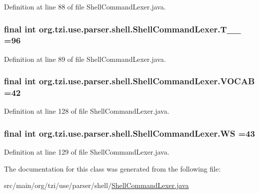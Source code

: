 Definition at line 88 of file Shell\-Command\-Lexer.\-java.

\hypertarget{classorg_1_1tzi_1_1use_1_1parser_1_1shell_1_1_shell_command_lexer_a722d65bcb74c7721bde6278b6c999754}{
\subsubsection[{T\-\_\-\-\_\-96}]{\setlength{\rightskip}{0pt plus 5cm}final int org.\-tzi.\-use.\-parser.\-shell.\-Shell\-Command\-Lexer.\-T\-\_\-\-\_ =96\hspace{0.3cm}{\ttfamily [static]}}}\label{classorg_1_1tzi_1_1use_1_1parser_1_1shell_1_1_shell_command_lexer_a722d65bcb74c7721bde6278b6c999754}


Definition at line 89 of file Shell\-Command\-Lexer.\-java.

\hypertarget{classorg_1_1tzi_1_1use_1_1parser_1_1shell_1_1_shell_command_lexer_aef9df2419ad339c0b9e0532ccc563394}{
\subsubsection[{V\-O\-C\-A\-B}]{\setlength{\rightskip}{0pt plus 5cm}final int org.\-tzi.\-use.\-parser.\-shell.\-Shell\-Command\-Lexer.\-V\-O\-C\-A\-B =42\hspace{0.3cm}{\ttfamily [static]}}}\label{classorg_1_1tzi_1_1use_1_1parser_1_1shell_1_1_shell_command_lexer_aef9df2419ad339c0b9e0532ccc563394}


Definition at line 128 of file Shell\-Command\-Lexer.\-java.

\hypertarget{classorg_1_1tzi_1_1use_1_1parser_1_1shell_1_1_shell_command_lexer_ac3edb35a682d577bd83f29ebf5528feb}{
\subsubsection[{W\-S}]{\setlength{\rightskip}{0pt plus 5cm}final int org.\-tzi.\-use.\-parser.\-shell.\-Shell\-Command\-Lexer.\-W\-S =43\hspace{0.3cm}{\ttfamily [static]}}}\label{classorg_1_1tzi_1_1use_1_1parser_1_1shell_1_1_shell_command_lexer_ac3edb35a682d577bd83f29ebf5528feb}


Definition at line 129 of file Shell\-Command\-Lexer.\-java.



The documentation for this class was generated from the following file\-:\begin{DoxyCompactItemize}
\item 
src/main/org/tzi/use/parser/shell/\hyperlink{_shell_command_lexer_8java}{Shell\-Command\-Lexer.\-java}\end{DoxyCompactItemize}
